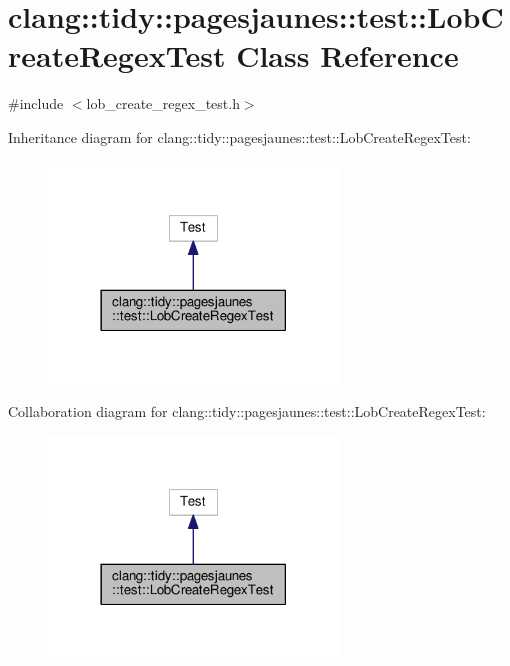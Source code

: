 \hypertarget{classclang_1_1tidy_1_1pagesjaunes_1_1test_1_1_lob_create_regex_test}{}\section{clang\+:\+:tidy\+:\+:pagesjaunes\+:\+:test\+:\+:Lob\+Create\+Regex\+Test Class Reference}
\label{classclang_1_1tidy_1_1pagesjaunes_1_1test_1_1_lob_create_regex_test}


{\ttfamily \#include $<$lob\+\_\+create\+\_\+regex\+\_\+test.\+h$>$}



Inheritance diagram for clang\+:\+:tidy\+:\+:pagesjaunes\+:\+:test\+:\+:Lob\+Create\+Regex\+Test\+:
\nopagebreak
\begin{figure}[H]
\begin{center}
\leavevmode
\includegraphics[width=218pt]{classclang_1_1tidy_1_1pagesjaunes_1_1test_1_1_lob_create_regex_test__inherit__graph}
\end{center}
\end{figure}


Collaboration diagram for clang\+:\+:tidy\+:\+:pagesjaunes\+:\+:test\+:\+:Lob\+Create\+Regex\+Test\+:
\nopagebreak
\begin{figure}[H]
\begin{center}
\leavevmode
\includegraphics[width=218pt]{classclang_1_1tidy_1_1pagesjaunes_1_1test_1_1_lob_create_regex_test__coll__graph}
\end{center}
\end{figure}
